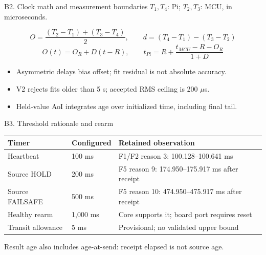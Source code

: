 \begin{frame}[t]{B2. Clock math and measurement boundaries}
\(T_1,T_4\): Pi; \(T_2,T_3\): MCU, in microseconds.\par\medskip
\[O=\frac{(T_2-T_1)+(T_3-T_4)}{2},\qquad d=(T_4-T_1)-(T_3-T_2)\]
\[O(t)=O_R+D(t-R),\qquad t_{Pi}=R+\frac{t_{MCU}-R-O_R}{1+D}\]
\begin{itemize}\item Asymmetric delays bias offset; fit residual is not absolute accuracy.\item V2 rejects fits older than 5 s; accepted RMS ceiling is 200 \(\mu\)s.\item Held-value AoI integrates age over initialized time, including final tail.\end{itemize}
\end{frame}

\begin{frame}[t]{B3. Threshold rationale and rearm}
\begin{tabular}{@{}L{.24\linewidth}L{.17\linewidth}L{.51\linewidth}@{}}\toprule
Timer & Configured & Retained observation\\\midrule
Heartbeat & 100 ms & F1/F2 reason 3: 100.128--100.641 ms\\[5pt]
Source HOLD & 200 ms & F5 reason 9: 174.950--175.917 ms after receipt\\[5pt]
Source FAILSAFE & 500 ms & F5 reason 10: 474.950--475.917 ms after receipt\\[5pt]
Healthy rearm & 1,000 ms & Core supports it; board port requires reset\\[5pt]
Transit allowance & 5 ms & Provisional; no validated upper bound\\\bottomrule
\end{tabular}\par
\bigskip Result age also includes age-at-send: receipt elapsed is not source age.
\end{frame}

